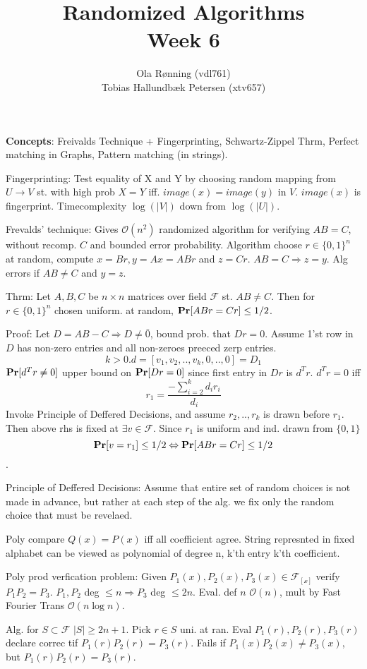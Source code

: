\documentclass[a4paper]{article}
\author{Ola Rønning (vdl761)\\Tobias Hallundbæk Petersen (xtv657)}
\title{Randomized Algorithms \\ Week 6}
\def\Pr{\mbox{\textbf{Pr}}}
\begin{document}
\textbf{Concepts}: Freivalds Technique + Fingerprinting, Schwartz-Zippel Thrm, Perfect matching in Graphs, Pattern matching (in strings).

Fingerprinting: Test equality of X and Y by choosing random mapping from \(U\rightarrow V\) st. with high prob \(X=Y\) iff. \(image(x) = image(y)\) in \(V\). \(image(x)\) is fingerprint. Timecomplexity \(\log(|V|)\) down from \(\log(|U|)\).

Frevalds' technique: Gives \(\mathcal{O}(n^2)\) randomized algorithm for verifying \(AB=C\), without recomp. \(C\) and bounded error probability. Algorithm choose \(r \in \{0,1\}^n\) at random, compute \(x=Br,y=Ax=ABr\) and \(z=Cr\). \(AB =C \Rightarrow z=y\). Alg errors if \(AB\neq C\) and \(y=z\).

Thrm: Let \(A,B,C\) be \(n\times n\) matrices over field \(\mathcal{F}\) st. \(AB \neq C\). Then for \(r \in \{0,1\}^n\) chosen uniform. at random, \(\Pr[ABr=Cr]\leq 1/2\).

Proof: Let \(D=AB-C \Rightarrow D\neq \bar{0}\), bound prob. that \(Dr=0\). Assume 1'st row in \(D\) has non-zero entries and all non-zeroes preeced zerp entries.
\[k>0.d=[v_1,v_2,..,v_k,0,..,0]=D_1\]
\(\Pr[d^Tr \neq 0]\) upper bound on \(\Pr[Dr = 0]\) since first entry in \(Dr\) is \(d^Tr\). \(d^Tr=0\) iff 
\[r_1 = \frac{-\sum_{i=2}^k d_ir_i}{d_i}\]
Invoke Principle of Deffered Decisions, and assume \(r_2,..,r_k\) is drawn before \(r_1\). Then above rhs is fixed at \(\exists v \in \mathcal{F}\). Since \(r_1\) is uniform and ind. drawn from \(\{0,1\}\) \[\Pr[v=r_1] \leq 1/2 \Leftrightarrow \Pr[ABr = Cr] \leq 1/2\].

Principle of Deffered Decisions: Assume that entire set of random choices is not made in advance, but rather at each step of the alg. we fix only the random choice that must be revelaed.

Poly compare \(Q(x) = P(x)\) iff all coefficient agree. String represnted in fixed alphabet can be viewed as polynomial of degree n, k'th entry k'th coefficient.

Poly prod verfication problem: Given \(P_1(x),P_2(x),P_3(x) \in \mathcal{F_{[x]}}\) verify \(P_1P_2 = P_3\). \(P_1,P_2\) deg \(\leq n \Rightarrow P_3\) deg \(\leq 2n\). Eval. def \(n\) \(\mathcal{O}(n)\), mult by Fast Fourier Trans \(\mathcal{O}(n \log n)\).

Alg. for \(S \subset \mathcal{F}\) \(|S|\geq 2n+1\). Pick \(r \in S\) uni. at ran. Eval \(P_1(r),P_2(r),P_3(r)\) declare correc tif \(P_1(r)P_2(r)=P_3(r)\). Fails if \(P_1(x)P_2(x) \neq P_3(x)\), but \(P_1(r)P_2(r)=P_3(r)\).
\end{document}

